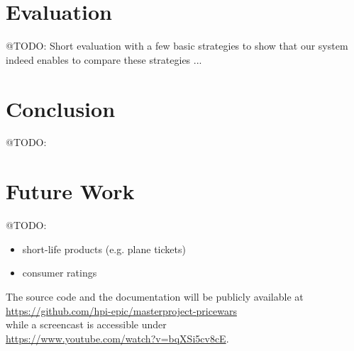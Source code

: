 %
\section{Evaluation}
\label{sec:evaluation}
%
@TODO: Short evaluation with a few basic strategies to show that our system indeed enables to compare these strategies ... 

\section{Conclusion}
\label{sec:conclusion}
%

@TODO:\\

\section{Future Work}
\label{sec:Future_Work}
%

@TODO:\\
\begin{itemize}
\item short-life products (e.g. plane tickets)
\item consumer ratings
\end{itemize}

The source code and the documentation will be publicly available at\\
\url{https://github.com/hpi-epic/masterproject-pricewars} \\
while a screencast is accessible under\\
\sloppy
\url{https://www.youtube.com/watch?v=bqXSi5cv8cE}.\\
